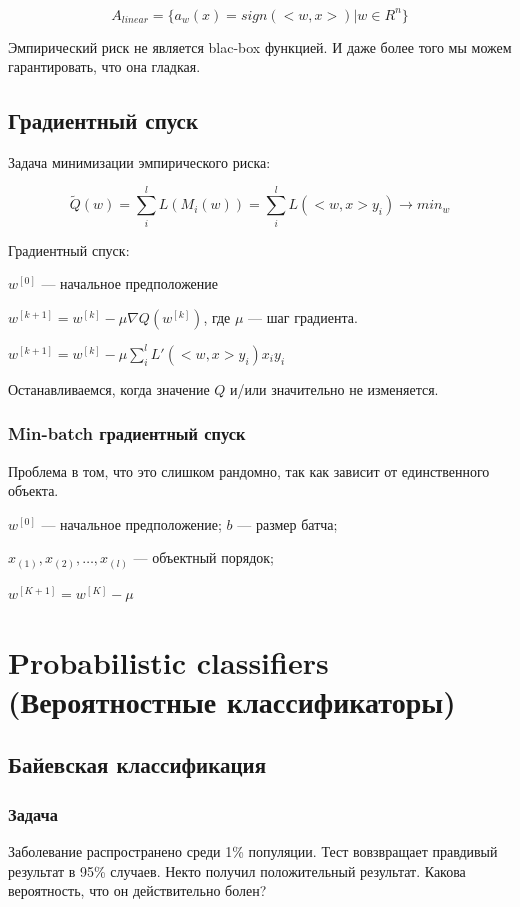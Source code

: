 \documentclass[10pt,a4paper,oneside,titlepage]{report}
\theoremstyle{defenition}
\theoremstyle{theorem}
\begin{document}
$$
A_{linear} = \{a_w(x) = sign(<w, x>) | w \in R^n\}
$$

Эмпирический риск не является blac-box функцией. И даже более того мы можем гарантировать, что она гладкая.

\subsection{Градиентный спуск}

Задача минимизации эмпирического риска:

$$
\tilde{Q}(w) = \sum_i^l L(M_i(w)) = \sum_i^l L(<w,x>y_i) \rightarrow min_w
$$

Градиентный спуск:

$w^{[0]}$ --- начальное предположение

$w^{[k+1]} = w^{[k]} - \mu\nabla Q(w^{[k]})$, где $\mu$ --- шаг градиента.

$w^{[k+1]}=w^{[k]} - \mu\sum_i^l L'(<w, x>y_i)x_iy_i$

Останавливаемся, когда значение $Q$ и/или значительно не изменяется.

\subsubsection{Min-batch градиентный спуск}

Проблема в том, что это слишком рандомно, так как зависит от единственного объекта.

$w^{[0]}$ --- начальное предположение; $b$ --- размер батча;

$x_{(1)}, x_{(2)}, \ldots, x_{(l)}$ --- объектный порядок;

$w^{[K+1]} = w^{[K]} - \mu$

\section{Probabilistic classifiers (Вероятностные классификаторы)}

\subsection{Байевская классификация}

\subsubsection{Задача}

Заболевание распространено среди 1\% популяции. Тест вовзвращает правдивый результат в 95\% случаев. Некто получил положительный результат. Какова вероятность, что он действительно болен?
\end{document}
